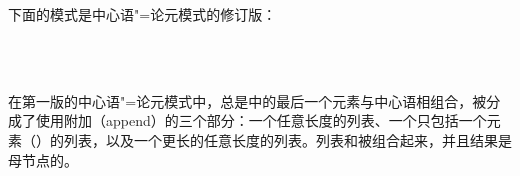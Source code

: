 下面的模式是中心语"=论元模式的修订版：
\begin{samepage}
\begin{schema}
\label{schema-bin-prel2}
~\\
 \impl\\
\end{schema}
\end{samepage}
在第一版的中心语"=论元模式中，总是\subcatl 中的最后一个元素与中心语相组合，\subcatl 被分成了使用附加（append）的三个部分：一个任意长度的列表、一个只包括一个元素（）的列表，以及一个更长的任意长度的列表。列表和被组合起来，并且结果是母节点的\subcatv。
